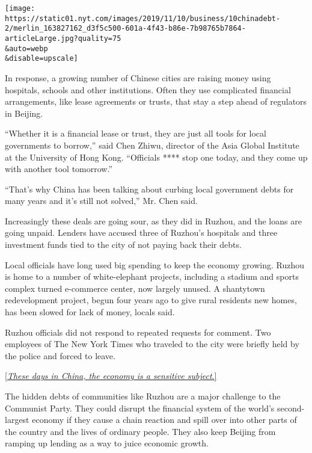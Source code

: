 \texttt{[image: https://static01.nyt.com/images/2019/11/10/business/10chinadebt-2/merlin\_163827162\_d3f5c500-601a-4f43-b86e-7b98765b7864-articleLarge.jpg?quality=75\\\&auto=webp\\\&disable=upscale]}

In response, a growing number of Chinese cities are raising money using
hospitals, schools and other institutions. Often they use complicated
financial arrangements, like lease agreements or trusts, that stay a
step ahead of regulators in Beijing.

``Whether it is a financial lease or trust, they are just all tools for
local governments to borrow,'' said Chen Zhiwu, director of the Asia
Global Institute at the University of Hong Kong. ``Officials **** stop
one today, and they come up with another tool tomorrow.''

``That's why China has been talking about curbing local government debts
for many years and it's still not solved,'' Mr. Chen said.

Increasingly these deals are going sour, as they did in Ruzhou, and the
loans are going unpaid. Lenders have accused three of Ruzhou's hospitals
and three investment funds tied to the city of not paying back their
debts.

Local officials have long used big spending to keep the economy growing.
Ruzhou is home to a number of white-elephant projects, including a
stadium and sports complex turned e-commerce center, now largely unused.
A shantytown redevelopment project, begun four years ago to give rural
residents new homes, has been slowed for lack of money, locals said.

Ruzhou officials did not respond to repeated requests for comment. Two
employees of The New York Times who traveled to the city were briefly
held by the police and forced to leave.

\href{https://www.nytimes.com/2019/11/10/business/china-reporter-police.html}{{[}}\href{https://www.nytimes.com/2019/11/10/business/china-reporter-police.html}{\emph{These
days in China, the economy is a sensitive
subject}}\href{https://www.nytimes.com/2019/11/10/business/china-reporter-police.html}{.{]}}

The hidden debts of communities like Ruzhou are a major challenge to the
Communist Party. They could disrupt the financial system of the world's
second-largest economy if they cause a chain reaction and spill over
into other parts of the country and the lives of ordinary people. They
also keep Beijing from ramping up lending as a way to juice economic
growth.

